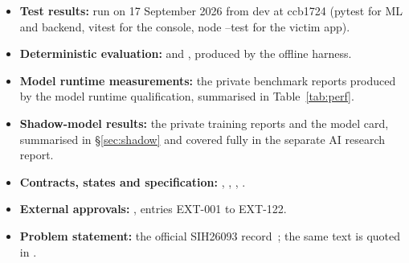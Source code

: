 \documentclass[11pt,a4paper]{article}
\newcommand{\codeus}{\textunderscore\allowbreak}
\DeclareRobustCommand{\code}[1]{{\ttfamily\let\_\codeus #1}}
\begin{document}
\begin{itemize}
  \item \textbf{Test results:} run on 17 September 2026 from \code{dev} at \code{ccb1724}
        (\code{pytest} for ML and backend, \code{vitest} for the console, \code{node --test} for the
        victim app).
  \item \textbf{Deterministic evaluation:}  and
        , produced by the offline harness.
  \item \textbf{Model runtime measurements:} the private benchmark reports produced by the model
        runtime qualification, summarised in Table~\ref{tab:perf}.
  \item \textbf{Shadow-model results:} the private training reports and the model card, summarised in
        \S\ref{sec:shadow} and covered fully in the separate AI research report.
  \item \textbf{Contracts, states and specification:} ,
        , ,
        .
  \item \textbf{External approvals:} , entries EXT-001 to
        EXT-122.
  \item \textbf{Problem statement:} the official SIH26093 record~\cite{sih26093}; the same text is
        quoted in .
\end{itemize}
\end{document}
